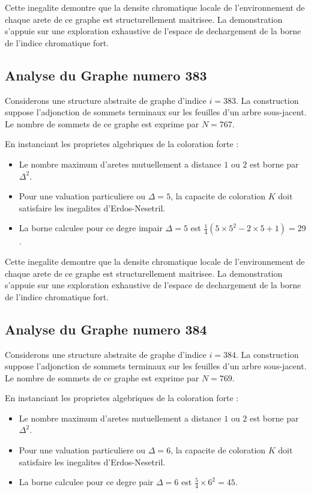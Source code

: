 \documentclass[11pt,a4paper]{article}
\begin{document}
Cette inegalite demontre que la densite chromatique locale de l'environnement de chaque arete de ce graphe est structurellement maitrisee. La demonstration s'appuie sur une exploration exhaustive de l'espace de dechargement de la borne de l'indice chromatique fort.

\subsection{Analyse du Graphe numero 383}
Considerons une structure abstraite de graphe d'indice $i = 383$. La construction suppose l'adjonction de sommets terminaux sur les feuilles d'un arbre sous-jacent. Le nombre de sommets de ce graphe est exprime par $N = 767$.

En instanciant les proprietes algebriques de la coloration forte :
\begin{itemize}
\item Le nombre maximum d'aretes mutuellement a distance $1$ ou $2$ est borne par $\Delta^2$.
\item Pour une valuation particuliere ou $\Delta = 5$, la capacite de coloration $K$ doit satisfaire les inegalites d'Erdos-Nesetril.
\item La borne calculee pour ce degre impair $\Delta = 5$ est $\frac{1}{4}(5 \times 5^2 - 2 \times 5 + 1) = 29$.
\end{itemize}

Cette inegalite demontre que la densite chromatique locale de l'environnement de chaque arete de ce graphe est structurellement maitrisee. La demonstration s'appuie sur une exploration exhaustive de l'espace de dechargement de la borne de l'indice chromatique fort.

\subsection{Analyse du Graphe numero 384}
Considerons une structure abstraite de graphe d'indice $i = 384$. La construction suppose l'adjonction de sommets terminaux sur les feuilles d'un arbre sous-jacent. Le nombre de sommets de ce graphe est exprime par $N = 769$.

En instanciant les proprietes algebriques de la coloration forte :
\begin{itemize}
\item Le nombre maximum d'aretes mutuellement a distance $1$ ou $2$ est borne par $\Delta^2$.
\item Pour une valuation particuliere ou $\Delta = 6$, la capacite de coloration $K$ doit satisfaire les inegalites d'Erdos-Nesetril.
\item La borne calculee pour ce degre pair $\Delta = 6$ est $\frac{5}{4} \times 6^2 = 45$.
\end{itemize}
\end{document}
